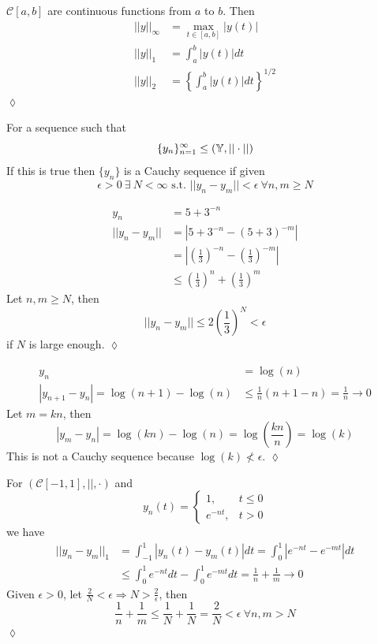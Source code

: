 \begin{example}
$\mathcal{C}[a,b]$ are continuous functions from $a$ to $b$. Then
\begin{align*}
||y||_\infty &= \max_{t\in[a,b]}|y(t)| \\
||y||_1 &= \int_a^b|y(t)|dt \\
||y||_2 &= \left\lbrace\int_a^b|y(t)|dt\right\rbrace^{1/2}
\end{align*}
$\lozenge$
\end{example}

\begin{definition}
For a sequence such that
$$\{y_n\}_{n=1}^\infty \leq (\mathbb{Y},||\cdot||)$$
If this is true then $\{y_n\}$ is a Cauchy sequence if given
$$\epsilon>0 ~\exists ~N<\infty \text{ s.t. } ||y_n-y_m||<\epsilon ~\forall n,m\geq N$$
\end{definition}

\begin{example}
\begin{align*}
y_n &= 5+3^{-n} \\
||y_n-y_m|| &= |5+3^{-n}-(5+3)^{-m}| \\
&= \left|\left(\frac{1}{3}\right)^{-n} - \left(\frac{1}{3}\right)^{-m}\right| \\
&\leq \left(\frac{1}{3}\right)^n + \left(\frac{1}{3}\right)^m
\end{align*}
Let $n,m\geq N$, then
$$||y_n-y_m|| \leq 2\left(\frac{1}{3}\right)^N < \epsilon$$
if $N$ is large enough.
$\lozenge$
\end{example}

\begin{example}
\begin{align*}
y_n &= \log(n) \\
|y_{n+1}-y_n| = \log(n+1)-\log(n) &\leq \frac{1}{n}(n+1-n) = \frac{1}{n}\to 0
\end{align*}
Let $m=kn$, then
$$|y_m-y_n| = \log(kn)-\log(n) = \log\left(\frac{kn}{n}\right) = \log(k)$$
This is not a Cauchy sequence because $\log(k)\nless\epsilon$.
$\lozenge$
\end{example}

\begin{example}
\label{ex:1norm}
For $(\mathcal{C}[-1,1],||,\cdot)$ and
$$y_n(t) = \begin{cases} 1, & t\leq 0 \\ e^{-nt}, & t>0 \end{cases}$$
we have
\begin{align*}
||y_n-y_m||_1 &= \int_{-1}^1|y_n(t)-y_m(t)|dt = \int_0^1|e^{-nt}-e^{-mt}|dt \\
&\leq \int_0^1e^{-nt}dt - \int_0^1e^{-mt}dt = \frac{1}{n} + \frac{1}{m} \to 0
\end{align*}
Given $\epsilon>0$, let $\frac{2}{N}<\epsilon\Rightarrow N>\frac{2}{\epsilon}$, then
$$\frac{1}{n} + \frac{1}{m}\leq \frac{1}{N}+\frac{1}{N} = \frac{2}{N}<\epsilon ~\forall n,m>N$$
$\lozenge$
\end{example}

